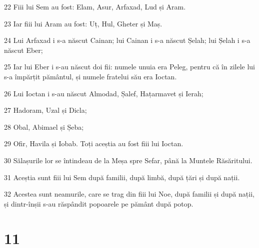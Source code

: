 \par 22 Fiii lui Sem au fost: Elam, Asur, Arfaxad, Lud și Aram.
\par 23 Iar fiii lui Aram au fost: Uț, Hul, Gheter și Maș.
\par 24 Lui Arfaxad i s-a născut Cainan; lui Cainan i s-a născut Șelah; lui Șelah i s-a născut Eber;
\par 25 Iar lui Eber i s-au născut doi fii: numele unuia era Peleg, pentru că în zilele lui s-a împărțit pământul, și numele fratelui său era Ioctan.
\par 26 Lui Ioctan i s-au născut Almodad, Șalef, Hațarmavet și Ierah;
\par 27 Hadoram, Uzal și Dicla;
\par 28 Obal, Abimael și Șeba;
\par 29 Ofir, Havila și Iobab. Toți aceștia au fost fiii lui Ioctan.
\par 30 Sălașurile lor se întindeau de la Meșa spre Sefar, până la Muntele Răsăritului.
\par 31 Aceștia sunt fiii lui Sem după familii, după limbă, după țări și după nații.
\par 32 Acestea sunt neamurile, care se trag din fiii lui Noe, după familii și după nații, și dintr-înșii s-au răspândit popoarele pe pământ după potop.

\chapter{11}

